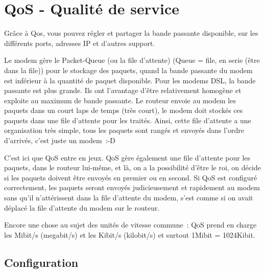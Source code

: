 
\section{QoS - Qualité de service}

    Grâce à Qos, vous pouvez régler et partager la bande passante disponible,
    sur les différents ports, adresses IP et d'autres support.

    Le modem gère le Packet-Queue (ou la file d'attente) (Queue = file, en serie
    (être dans la file)) pour le stockage des paquets, quand la bande passante
    du modem est inférieur à la quantité de paquet disponible. Pour les modems
    DSL, la bande passante est plus grande. Ils ont l'avantage d'être
    relativement homogène et exploite au maximum de bande passante. Le routeur
    envoie au modem les paquets dans un court laps de temps (très court), le modem
    doit stockés ces paquets dans une file d'attente pour les traités. Ainsi,
    cette file d'attente a une organisation très simple, tous les paquets sont
    rangés et envoyés dans l'ordre d'arrivés, c'est juste un modem~:-D

    C'est ici que QoS entre en jeux. QoS gère également une file d'attente pour
    les paquets, dans le routeur lui-même, et là, on a la possibilité d'être
    le roi, on décide si les paquets doivent être envoyés en premier ou en second.
    Si QoS est configuré correctement, les paquets seront envoyés judicieusement
    et rapidement au modem sans qu'il n'attérissent dans la file d'attente
    du modem, s'est comme si on avait déplacé la file d'attente du modem sur le
    routeur.

    Encore une chose au sujet des unités de vitesse
    commune~: QoS prend en charge les Mibit/s (megabit/s) et les Kibit/s (kilobit/s)
    et surtout 1Mibit = 1024Kibit.

\subsection{Configuration}

